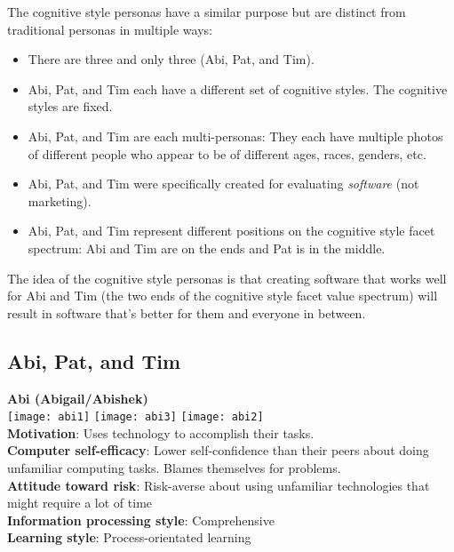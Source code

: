 The cognitive style personas have a similar purpose but are distinct from traditional personas in multiple ways:
\begin{itemize}
\item{There are three and only three (Abi, Pat, and Tim).}
\item{Abi, Pat, and Tim each have a different set of cognitive styles. The cognitive styles are fixed.}
\item{Abi, Pat, and Tim are each multi-personas: They each have multiple photos of different people who appear to be of different ages, races, genders, etc.}
\item{Abi, Pat, and Tim were specifically created for evaluating \textit{software} (not marketing).}
\item{Abi, Pat, and Tim represent different positions on the cognitive style facet spectrum: Abi and Tim are on the ends and Pat is in the middle.}
\end{itemize}

The idea of the cognitive style personas is that creating software that works well for Abi and Tim (the two ends of the cognitive style facet value spectrum) will result in software that's better for them and everyone in between.

\nomargins
\subsection{Abi, Pat, and Tim}

\begin{tcolorbox}[colback=abicolor!100!white,colframe=abicolor2!100!black]
{\Large \textbf{Abi (Abigail/Abishek)}}\\
\texttt{[image: abi1]}
\texttt{[image: abi3]}
\texttt{[image: abi2]}\\
\textbf{Motivation}: Uses technology to accomplish their tasks.\\
\textbf{Computer self-efficacy}: Lower self-confidence than their peers about doing unfamiliar computing tasks. Blames themselves for problems.\\
\textbf{Attitude toward risk}: Risk-averse about using unfamiliar technologies that might require a lot of time\\
\textbf{Information processing style}: Comprehensive\\
\textbf{Learning style}: Process-orientated learning
\end{tcolorbox}

